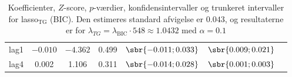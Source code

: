 \begin{table}[h]
{\begin{tabular}{lcccccc}
\textcolor{blue3}{lag1}   & $- 0.010$& $ -4.362$  &0.499  &  $\sbr{-0.011 ; 0.033}$&  $\sbr{0.009           ;    0.021 }$\\
\textcolor{blue3}{lag4}  &0.002 &   1.106  &0.311    & $\sbr{ -0.014;   0.028 }$  & $\sbr{0.001              ; 0.003}$\\
\bottomrule
\end{tabular}  
}
\caption{
Koefficienter, \(Z\)-score, \(p\)-værdier, konfidensintervaller og trunkeret intervaller for lasso$_{\text{TG}}$ (BIC). Den estimeres standard afvigelse er \(0.043\), og resultaterne er for \(\lambda_{TG} = \lambda_\text{BIC} \cdot 548 \approx 1.0432\) med \(\alpha = 0.1\)} \label{tab:fixedLassoInf_bic}
\end{table} 
